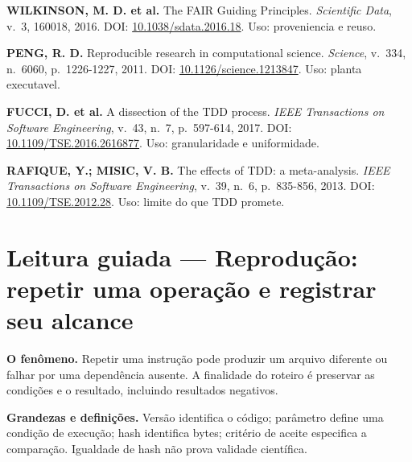 \begin{referencia}
\textbf{WILKINSON, M. D. et al.} The FAIR Guiding Principles. \emph{Scientific Data}, v.~3, 160018, 2016. DOI: \href{https://doi.org/10.1038/sdata.2016.18}{10.1038/sdata.2016.18}. Uso: proveniencia e reuso.
\end{referencia}

\begin{referencia}
\textbf{PENG, R. D.} Reproducible research in computational science. \emph{Science}, v.~334, n.~6060, p.~1226-1227, 2011. DOI: \href{https://doi.org/10.1126/science.1213847}{10.1126/science.1213847}. Uso: planta executavel.
\end{referencia}

\begin{referencia}
\textbf{FUCCI, D. et al.} A dissection of the TDD process. \emph{IEEE Transactions on Software Engineering}, v.~43, n.~7, p.~597-614, 2017. DOI: \href{https://doi.org/10.1109/TSE.2016.2616877}{10.1109/TSE.2016.2616877}. Uso: granularidade e uniformidade.
\end{referencia}

\begin{referencia}
\textbf{RAFIQUE, Y.; MISIC, V. B.} The effects of TDD: a meta-analysis. \emph{IEEE Transactions on Software Engineering}, v.~39, n.~6, p.~835-856, 2013. DOI: \href{https://doi.org/10.1109/TSE.2012.28}{10.1109/TSE.2012.28}. Uso: limite do que TDD promete.
\end{referencia}


\section[Leitura guiada]{Leitura guiada — Reprodução: repetir uma operação e registrar seu alcance}
\begin{descricao}
\textbf{O fenômeno.} Repetir uma instrução pode produzir um arquivo diferente ou falhar por uma dependência ausente. A finalidade do roteiro é preservar as condições e o resultado, incluindo resultados negativos.
\end{descricao}

\begin{definicao}
\textbf{Grandezas e definições.} Versão identifica o código; parâmetro define uma condição de execução; hash identifica bytes; critério de aceite especifica a comparação. Igualdade de hash não prova validade científica.
\end{definicao}

